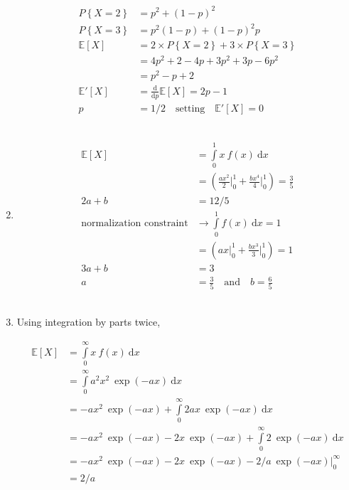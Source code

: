 \begin{enumerate}
	
		\begin{align}
			P \left\{X = 2\right\} &= p^2 + (1-p)^2 \nonumber \\
			P \left\{X = 3\right\} &= p^2 (1-p) + (1-p)^2 p \nonumber \\
			\mathbb{E}[X] &= 2 \times P \left\{X = 2\right\} + 3 \times P \left\{X = 3\right\} \\
			&= 4p^2 + 2 - 4p + 3p^2 + 3p - 6p^2 \nonumber \\
			&= p^2 - p + 2 \nonumber \\
			\mathbb{E}'[X] &= \frac{\mathrm{d}}{\mathrm{d} p} \mathbb{E}[X] = 2p - 1 \\
			p &= 1/2 \quad \text{setting} \quad 	\mathbb{E}'[X] = 0			
		\end{align} \\
	
	
	\item 
		\begin{align}
			\mathbb{E}[X] &= \int\limits_{0}^{1} x\ f(x)\ \mathrm{d}x \nonumber \\
			&= \left( \frac{ax^2}{2} \Big|_0^1 + \frac{bx^4}{4}\Big|_0^1  \right) = \frac{3}{5} \nonumber \\
			2a + b &= 12/5 \\
			\text{normalization constraint} &\to  \int\limits_{0}^{1}  f(x)\ \mathrm{d}x = 1 \nonumber \\
			&= \left( ax \Big|_0^1 + \frac{bx^3}{3}\Big|_0^1  \right) = 1 \nonumber \\
			3a + b &= 3 \\
			a &= \frac{3}{5} \quad \text{and} \quad b = \frac{6}{5} 
		\end{align} \\
	
	
	\item Using integration by parts twice,
	
		\begin{align}
			\mathbb{E}[X] &= \int\limits_{0}^{\infty} x\ f(x)\ \mathrm{d}x \nonumber \\
			&= \int\limits_{0}^{\infty} a^2 x^2\ \exp(-ax)\ \mathrm{d}x \nonumber \\
			&= -a x^2\ \exp(-ax) + \int\limits_{0}^{\infty} 2a x\ \exp(-ax)\ \mathrm{d}x \nonumber \\
			&= -a x^2\ \exp(-ax) - 2x\ \exp(-ax)  + \int\limits_{0}^{\infty} 2\ \exp(-ax)\ \mathrm{d}x \nonumber \\
			&= -a x^2\ \exp(-ax) - 2x\ \exp(-ax)  -  2/a \ \exp(-ax)  \Big|_0^\infty \nonumber \\
			&= 2/a 
		\end{align} \\
	

\end{enumerate}
